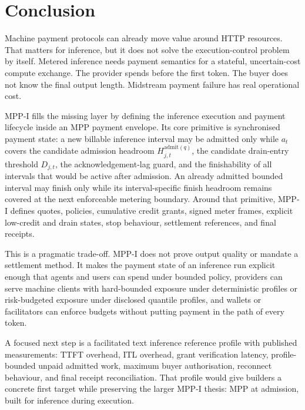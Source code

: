 \documentclass[11pt]{article}
\newcommand{\mppi}{MPP-I}
\begin{document}
\section{Conclusion}

Machine payment protocols can already move value around HTTP resources. That matters for inference, but it does not solve the execution-control problem by itself. Metered inference needs payment semantics for a stateful, uncertain-cost compute exchange. The provider spends before the first token. The buyer does not know the final output length. Midstream payment failure has real operational cost.

\mppi{} fills the missing layer by defining the inference execution and payment lifecycle inside an MPP payment envelope. Its core primitive is synchronised payment state: a new billable inference interval may be admitted only while \(a_t\) covers the candidate admission headroom \(H_{j,t}^{\mathrm{admit}(q)}\), the candidate drain-entry threshold \(D_{j,t}\), the acknowledgement-lag guard, and the finishability of all intervals that would be active after admission. An already admitted bounded interval may finish only while its interval-specific finish headroom remains covered at the next enforceable metering boundary. Around that primitive, \mppi{} defines quotes, policies, cumulative credit grants, signed meter frames, explicit low-credit and drain states, stop behaviour, settlement references, and final receipts.

This is a pragmatic trade-off. \mppi{} does not prove output quality or mandate a settlement method. It makes the payment state of an inference run explicit enough that agents and users can spend under bounded policy, providers can serve machine clients with hard-bounded exposure under deterministic profiles or risk-budgeted exposure under disclosed quantile profiles, and wallets or facilitators can enforce budgets without putting payment in the path of every token.

A focused next step is a facilitated text inference reference profile with published measurements: TTFT overhead, ITL overhead, grant verification latency, profile-bounded unpaid admitted work, maximum buyer authorisation, reconnect behaviour, and final receipt reconciliation. That profile would give builders a concrete first target while preserving the larger \mppi{} thesis: MPP at admission, built for inference during execution.
\end{document}

